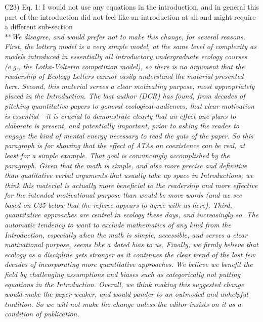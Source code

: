 \documentclass[letterpaper,11pt]{article}
\begin{document}
\noindent C23) Eq. 1: I would not use any equations in the introduction, and in general this part of the introduction did not feel like an introduction at all and might require a different sub-section \\

\noindent ***\emph{We disagree, and would prefer not to make this change, for several reasons. 
First, the lottery model is a very simple model, at the same level of complexity
as models introduced in essentially all introductory 
undergraduate ecology courses (e.g., the Lotka-Volterra competition model), so there is no argument that 
the readership of Ecology Letters cannot easily understand the material presented here.
Second, this material serves a clear motivating purpose, most appropriately placed in the Introduction. 
The last author (DCR) has found, from decades of pitching 
quantitative papers to general ecological audiences, that clear motivation is essential - it is crucial to demonstrate 
clearly that an effect one plans to elaborate is present, and potentially important, prior to asking the reader to engage 
the kind of mental energy necessary to read the guts of the paper. So this 
paragraph is for showing that the effect of ATAs on coexistence can be real, at least for a simple 
example. That goal is convincingly 
accomplished by the paragraph. Given that the math is simple, and also more precise and definitive than 
qualitative verbal arguments that usually take up space in Introductions, we think this material is actually
more beneficial to the readership and more effective for the intended motivational purpose than would be more words
(and we see based on C25 below that the referee appears to agree with us here). 
Third, quantitative approaches are central in ecology these days, and increasingly so. The automatic tendency
to want to exclude mathematics of any kind from the Introduction, especially when the math is simple,
accessible, and serves a clear motivational purpose, seems like a dated bias to us. 
Finally, we firmly believe that ecology as a discipline gets stronger as it continues the clear
trend of the last few decades of incorporating more quantitative approaches. We believe we
benefit the field by challenging assumptions and biases such as categorically not putting equations 
in the Introduction.
Overall, we think making this suggested change would make the paper weaker, and would pander to an
outmoded and unhelpful tradition. So we will not make the change unless the 
editor insists on it as a condition of publication.} \\
\end{document}
